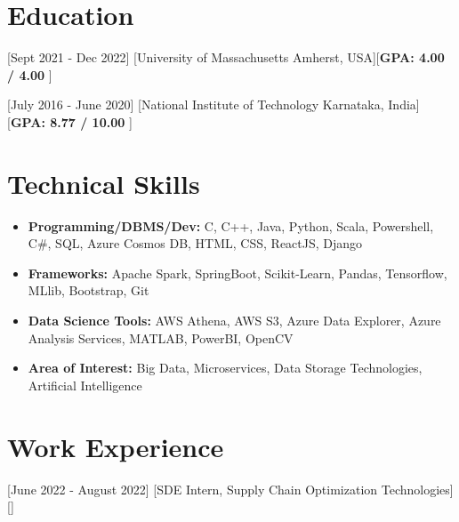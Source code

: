 \documentclass{article}
\begin{document}

\makecvtitle %


\section{Education}

[Sept 2021 - Dec 2022]
[University of Massachusetts Amherst, USA][\textbf{GPA: 4.00 / 4.00 }]

[July 2016 - June 2020]
[National Institute of Technology Karnataka, India] [\textbf{GPA: 8.77 / 10.00 }]


\section{Technical Skills}

\begin{itemize}

\item \textbf{Programming/DBMS/Dev:} C, C++, Java, Python, Scala, Powershell, C\#, SQL, Azure Cosmos DB, HTML, CSS, ReactJS, Django
\item \textbf{Frameworks:} Apache Spark, SpringBoot, Scikit-Learn, Pandas, Tensorflow, MLlib, Bootstrap, Git
\item \textbf{Data Science Tools:} AWS Athena, AWS S3, Azure Data Explorer, Azure Analysis Services, MATLAB, PowerBI, OpenCV
\item \textbf{Area of Interest:} Big Data, Microservices, Data Storage Technologies, Artificial Intelligence

\end{itemize}


\section{Work Experience}

[June 2022 - August 2022]
[SDE Intern, Supply Chain Optimization Technologies][]
\end{document}
